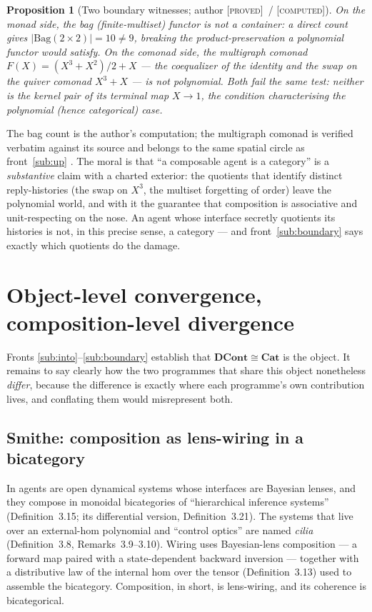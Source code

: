 \documentclass[11pt]{amsart}
\theoremstyle{plain}
\newtheorem{proposition}[theorem]{Proposition}
\theoremstyle{definition}
\newcommand{\Cat}{\mathbf{Cat}}
\newcommand{\DCont}{\mathbf{DCont}}
\newcommand{\iso}{\cong}
\newcommand{\gProved}{\textsc{[proved]}}
\newcommand{\gComputed}{\textsc{[computed]}}
\begin{document}
\begin{proposition}[Two boundary witnesses; author \gProved\ / \gComputed]\label{prop:boundary}
On the monad side, the bag (finite-multiset) functor is not a container: a direct count gives
$|\mathrm{Bag}(2\times2)| = 10 \neq 9$, breaking the product-preservation a polynomial functor
would satisfy. On the comonad side, the multigraph comonad
$F(X) = (X^{3}+X^{2})/2 + X$ --- the coequalizer of the identity and the swap on the quiver
comonad $X^{3}+X$ --- is not polynomial. Both fail the same test: neither is the kernel pair of
its terminal map $X\to 1$, the condition characterising the polynomial (hence categorical) case.
\end{proposition}

The bag count is the author's computation; the multigraph comonad is verified verbatim against
its source and belongs to the same spatial circle as front~\ref{sub:up}
\cite{ComonadsAsSpaces}. The moral is that ``a composable agent is a category'' is a
\emph{substantive} claim with a charted exterior: the quotients that identify distinct
reply-histories (the swap on $X^3$, the multiset forgetting of order) leave the
polynomial world, and with it the guarantee that composition is associative and unit-respecting
on the nose. An agent whose interface secretly quotients its histories is not, in this precise
sense, a category --- and front~\ref{sub:boundary} says exactly which quotients do the damage.

\section{Object-level convergence, composition-level divergence}\label{sec:contrast}

Fronts \ref{sub:into}--\ref{sub:boundary} establish that $\DCont\iso\Cat$ is the object.
It remains to say clearly how the two programmes that share this object nonetheless
\emph{differ}, because the difference is exactly where each programme's own contribution lives,
and conflating them would misrepresent both.

\subsection*{Smithe: composition as lens-wiring in a bicategory}
In \cite{SmitheCAI2} agents are open dynamical systems whose interfaces are Bayesian lenses, and
they compose in monoidal bicategories of ``hierarchical inference systems'' (Definition~3.15;
its differential version, Definition~3.21). The systems that live over an external-hom polynomial
and ``control optics'' are named \emph{cilia} (Definition~3.8, Remarks~3.9--3.10). Wiring uses
Bayesian-lens composition --- a forward map paired with a state-dependent backward inversion ---
together with a distributive law of the internal hom over the tensor (Definition~3.13) used to
assemble the bicategory. Composition, in short, is lens-wiring, and its coherence is bicategorical.
\end{document}
